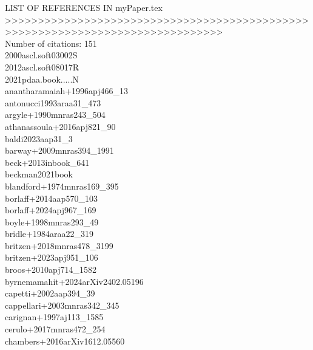 \documentclass{article}
\begin{document}
\noindent               LIST OF REFERENCES IN myPaper.tex \color{black} \\
\noindent >>>>>>>>>>>>>>>>>>>>>>>>>>>>>>>>>>>>>>>>>>>>>>>>>>>>>>>>>>>>>>>>>>>>>>>>>>>>>>> \color{black} \\
\noindent Number of citations: 151 \color{black} \\
\noindent 2000ascl.soft03002S \color{black} \\
\noindent 2012ascl.soft08017R \color{black} \\
\noindent 2021pdaa.book.....N \color{black} \\
\noindent anantharamaiah+1996apj466_13 \color{black} \\
\noindent antonucci1993araa31_473 \color{black} \\
\noindent argyle+1990mnras243_504 \color{black} \\
\noindent athanassoula+2016apj821_90 \color{black} \\
\noindent baldi2023aap31_3 \color{black} \\
\noindent barway+2009mnras394_1991 \color{black} \\
\noindent beck+2013inbook_641 \color{black} \\
\noindent beckman2021book \color{black} \\
\noindent blandford+1974mnras169_395 \color{black} \\
\noindent borlaff+2014aap570_103 \color{black} \\
\noindent borlaff+2024apj967_169 \color{black} \\
\noindent boyle+1998mnras293_49 \color{black} \\
\noindent bridle+1984araa22_319 \color{black} \\
\noindent britzen+2018mnras478_3199 \color{black} \\
\noindent britzen+2023apj951_106 \color{black} \\
\noindent broos+2010apj714_1582 \color{black} \\
\noindent byrnemamahit+2024arXiv2402.05196 \color{black} \\
\noindent capetti+2002aap394_39 \color{black} \\
\noindent cappellari+2003mnras342_345 \color{black} \\
\noindent carignan+1997aj113_1585 \color{black} \\
\noindent cerulo+2017mnras472_254 \color{black} \\
\noindent chambers+2016arXiv1612.05560 \color{black} \\
\end{document}
